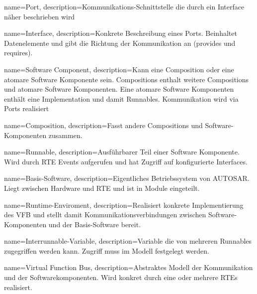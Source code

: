  {
   name=Port,
   description={Kommunikations-Schnittstelle die durch ein Interface näher beschrieben wird}
}

 {
   name=Interface,
   description={Konkrete Beschreibung eines Ports. Beinhaltet Datenelemente und gibt die Richtung der Kommunikation an (provides und requires).}
}

 {
   name=Software Component,
   description={Kann eine Composition oder eine atomare Software Komponente sein. Compositions enthalt weitere Compositions und atomare Software Komponenten. Eine atomare Software Komponenten enthält eine Implementation und damit Runnables. Kommunikation wird via Ports realisiert}
}

 {
   name=Composition,
   description={Fasst andere Compositions und Software-Komponenten zusammen.}
}

 {
   name=Runnable,
   description={Ausführbarer Teil einer Software Komponente. Wird durch RTE Events aufgerufen und hat Zugriff auf konfigurierte Interfaces.}
}

 {
   name=Basis-Software,
   description={Eigentliches Betriebssystem von AUTOSAR. Liegt zwischen Hardware und RTE und ist in Module eingeteilt.}
}

 {
   name=Runtime-Enviroment,
   description={Realisiert konkrete Implementierung des VFB und stellt damit Kommunikationsverbindungen zwischen Software-Komponenten und der Basis-Software bereit.}
}

 {
   name=Interrunnable-Variable,
   description={Variable die von mehreren Runnables zugegriffen werden kann. Zugriff muss im Modell festgelegt werden.}
}

 {
   name=Virtual Function Bus,
   description={Abstraktes Modell der Kommunikation und der Softwarekomponenten. Wird konkret durch eine oder mehrere RTEs realisiert.}
}
